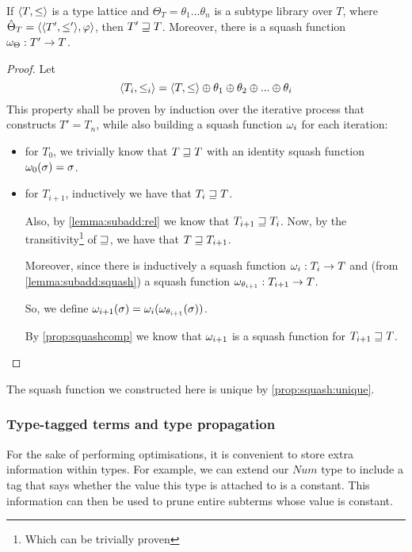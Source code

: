\documentclass[main.tex]{subfiles}
\begin{document}
\begin{prop}\label{prop:makesquashfun}
    If $\langle  T,  \leq  \rangle$ is a type lattice and
    $\Theta_T = \theta_1 ... \theta_n$ is a subtype library over $T$, where
    $\hat{\Theta}_T = \langle \langle  T',  \leq'  \rangle, \varphi \rangle$,
    then $T' \sqsupseteq T$. Moreover, there is a squash function
    $\omega_{\Theta} : T' \rightarrow T$.
\end{prop}
\begin{proof}
    Let \[
        \langle  T_i,  \leq_i  \rangle = \langle  T,  \leq  \rangle
        \oplus \theta_1 \oplus \theta_2 \oplus ... \oplus \theta_i
    \]
    This property shall be proven by induction over the iterative process
    that constructs $T' = T_n$, while also building a squash function
    $\omega_i$ for each iteration:
    \begin{itemize}
        \item for $T_0$, we trivially know that $T \sqsupseteq T$ with an identity
            squash function $\omega_0(\sigma) = \sigma$.
        \item for $T_{i + 1}$, inductively we have that $T_i \sqsupseteq T$.

            Also, by \cref{lemma:subadd:rel} we know that $T_{i + 1} \sqsupseteq T_{i}$.
            Now, by the transitivity\footnote{Which can be trivially
            proven} of $\sqsupseteq$, we have that $T \sqsupseteq T_{i + 1}$.

            Moreover, since there is inductively a squash function
            $\omega_i : T_i \rightarrow T$ and (from \cref{lemma:subadd:squash})
            a squash function $\omega_{\theta_{i + 1}} : T_{i + 1} \rightarrow T$.

            So, we define
            $\omega_{i + 1}(\sigma) = \omega_i(\omega_{\theta_{i + 1}}(\sigma))$.

            By \cref{prop:squashcomp} we know that $\omega_{i + 1}$ is a
            squash function for $T_{i + 1} \sqsupseteq T$.
    \end{itemize}
\end{proof}

The squash function we constructed here is unique by \cref{prop:squash:unique}.

\subsubsection{Type-tagged terms and type propagation}
\label{sec:propagation}
For the sake of performing optimisations, it is convenient to store extra
information within types. For example, we can extend our $Num$ type to include
a tag that says whether the value this type is attached to is a constant. This
information can then be used to prune entire subterms whose value is constant.
\end{document}

